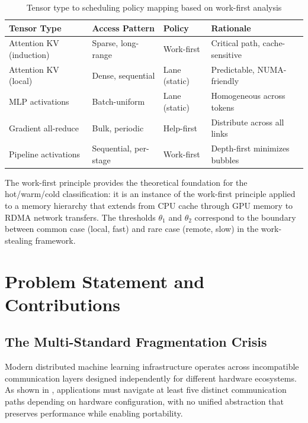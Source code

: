 \documentclass[11pt,letterpaper]{article}
\theoremstyle{definition}
\begin{document}
\begin{table}[htbp]
\centering
\caption{Tensor type to scheduling policy mapping based on work-first analysis}
\label{tab:wf-policy}
\begin{tabular}{@{}llll@{}}
\toprule
\textbf{Tensor Type} & \textbf{Access Pattern} & \textbf{Policy} & \textbf{Rationale} \\
\midrule
Attention KV (induction) & Sparse, long-range & Work-first & Critical path, cache-sensitive \\
Attention KV (local) & Dense, sequential & Lane (static) & Predictable, NUMA-friendly \\
MLP activations & Batch-uniform & Lane (static) & Homogeneous across tokens \\
Gradient all-reduce & Bulk, periodic & Help-first & Distribute across all links \\
Pipeline activations & Sequential, per-stage & Work-first & Depth-first minimizes bubbles \\
\bottomrule
\end{tabular}
\end{table}

The work-first principle provides the theoretical foundation for the hot/warm/cold classification: it is an instance of the work-first principle applied to a memory hierarchy that extends from CPU cache through GPU memory to RDMA network transfers. The thresholds $\theta_1$ and $\theta_2$ correspond to the boundary between common case (local, fast) and rare case (remote, slow) in the work-stealing framework.


\section{Problem Statement and Contributions}
\label{sec:problem-statement}

\subsection{The Multi-Standard Fragmentation Crisis}

Modern distributed machine learning infrastructure operates across incompatible communication layers designed independently for different hardware ecosystems. As shown in , applications must navigate at least five distinct communication paths depending on hardware configuration, with no unified abstraction that preserves performance while enabling portability.
\end{document}
